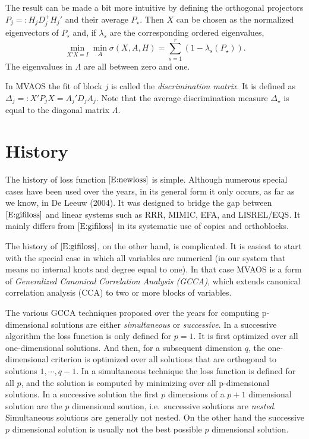 \documentclass[
  12pt,
  letterpaper,
  DIV=11,
  numbers=noendperiod]{scrreprt}
\newcommand{\df}{=:}
\begin{document}
The result can be made a bit more intuitive by defining the orthogonal
projectors \(P_j\df H_jD_j^+H_j'\) and their average \(P_\star\). Then
\(X\) can be chosen as the normalized eigenvectors of \(P_\star\) and,
if \(\lambda_s\) are the corresponding ordered eigenvalues,
\begin{equation}
\min_{X'X=I}\min_A\sigma(X,A,H)=\sum_{s=1}^r(1-\lambda_s(P_\star)).
\end{equation} The eigenvalues in \(\Lambda\) are all between zero and
one.

In MVAOS the fit of block \(j\) is called the \emph{discrimination
matrix}. It is defined as \(\Delta_j\df X'P_jX=A_j'D_jA_j\). Note that
the average discrimination measure \(\Delta_\star\) is equal to the
diagonal matrix \(\Lambda\).

\section{History}\label{history}

The history of loss function \(\eqref{E:newloss}\) is simple. Although
numerous special cases have been used over the years, in its general
form it only occurs, as far as we know, in De Leeuw (2004). It was
designed to bridge the gap between \(\eqref{E:gifiloss}\) and linear
systems such as RRR, MIMIC, EFA, and LISREL/EQS. It mainly differs from
\(\eqref{E:gifiloss}\) in its systematic use of copies and orthoblocks.

The history of \(\eqref{E:gifiloss}\), on the other hand, is
complicated. It is easiest to start with the special case in which all
variables are numerical (in our system that means no internal knots and
degree equal to one). In that case MVAOS is a form of \emph{Generalized
Canonical Correlation Analysis (GCCA)}, which extends canonical
correlation analysis (CCA) to two or more blocks of variables.

The various GCCA techniques proposed over the years for computing
p-dimensional solutions are either \emph{simultaneous} or
\emph{successive}. In a successive algorithm the loss function is only
defined for \(p=1\). It is first optimized over all one-dimensional
solutions. And then, for a subsequent dimension \(q\), the
one-dimensional criterion is optimized over all solutions that are
orthogonal to solutions \(1,\cdots,q-1\). In a simultaneous technique
the loss function is defined for all \(p\), and the solution is computed
by minimizing over all p-dimensional solutions. In a successive solution
the first \(p\) dimensions of a \(p+1\) dimensional solution are the
\(p\) dimensional soution, i.e.~successive solutions are \emph{nested}.
Simultaneous solutions are generally not nested. On the other hand the
successive \(p\) dimensional solution is usually not the best possible
\(p\) dimensional solution.
\end{document}
